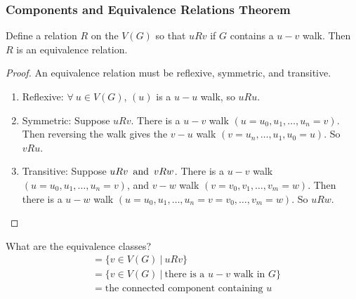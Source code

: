 \subsubsection*{Components and Equivalence Relations Theorem}
Define a relation $R$ on the $V(G)$ so that $uRv$ if $G$ contains a $u-v$ walk. Then $R$ is an equivalence relation.
\begin{proof}
    An equivalence relation must be reflexive, symmetric, and transitive.
    \begin{enumerate}
        \item Reflexive: $\forall~u \in V(G)$, $(u)$ is a $u-u$ walk, so $uRu$.
        \item Symmetric: Suppose $uRv$. There is a $u-v$ walk $(u=u_0, u_1, \ldots, u_n = v)$. Then reversing the walk gives the $v-u$ walk $(v=u_n, \ldots, u_1, u_0 = u)$. So $vRu$.
        \item Transitive: Suppose $uRv \operatorname{~\text{and}~} vRw$. There is a $u-v$ walk $(u=u_0, u_1, \ldots, u_n = v)$, and $v-w$ walk $(v=v_0, v_1, \ldots, v_m = w)$. Then there is a $u-w$ walk $(u=u_0, u_1, \ldots, u_n = v = v_0, \ldots, v_m = w)$. So $uRw$.
    \end{enumerate}
\end{proof}
What are the equivalence classes?
\begin{align*}
    [u] & = \{v \in V(G) ~|~ uRv\}                                 \\
        & = \{v \in V(G) ~|~ \text{there is a $u-v$ walk in $G$}\} \\
        & = \text{the connected component containing $u$}
\end{align*}

